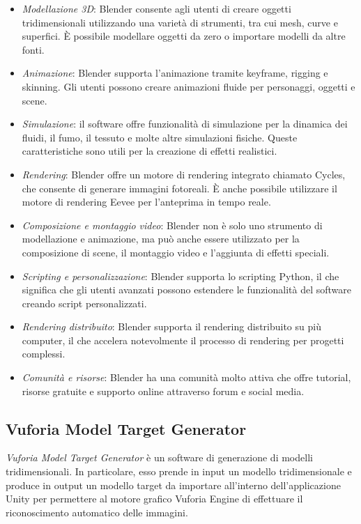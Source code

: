 \begin{itemize}
    \item \textit{Modellazione 3D}: Blender consente agli utenti di creare oggetti tridimensionali utilizzando una varietà di strumenti, tra cui mesh, curve e superfici. È possibile modellare oggetti da zero o importare modelli da altre fonti. 
    \item \textit{Animazione}: Blender supporta l'animazione tramite keyframe, rigging e skinning. Gli utenti possono creare animazioni fluide per personaggi, oggetti e scene.
    \item \textit{Simulazione}: il software offre funzionalità di simulazione per la dinamica dei fluidi, il fumo, il tessuto e molte altre simulazioni fisiche. Queste caratteristiche sono utili per la creazione di effetti realistici. 
    \item \textit{Rendering}: Blender offre un motore di rendering integrato chiamato Cycles, che consente di generare immagini fotoreali. È anche possibile utilizzare il motore di rendering Eevee per l'anteprima in tempo reale. 
    \item \textit{Composizione e montaggio video}: Blender non è solo uno strumento di modellazione e animazione, ma può anche essere utilizzato per la composizione di scene, il montaggio video e l'aggiunta di effetti speciali. 
    \item \textit{Scripting e personalizzazione}: Blender supporta lo scripting Python, il che significa che gli utenti avanzati possono estendere le funzionalità del software creando script personalizzati. 
    \item \textit{Rendering distribuito}: Blender supporta il rendering distribuito su più computer, il che accelera notevolmente il processo di rendering per progetti complessi. 
    \item \textit{Comunità e risorse}: Blender ha una comunità molto attiva che offre tutorial, risorse gratuite e supporto online attraverso forum e social media.
\end{itemize}

\subsection{Vuforia Model Target Generator}

\textit{Vuforia Model Target Generator} è un software di generazione di modelli tridimensionali. In particolare, esso prende in input un modello tridimensionale e produce in output un modello target da importare all'interno dell'applicazione Unity per permettere al motore grafico Vuforia Engine di effettuare il riconoscimento automatico delle immagini.

